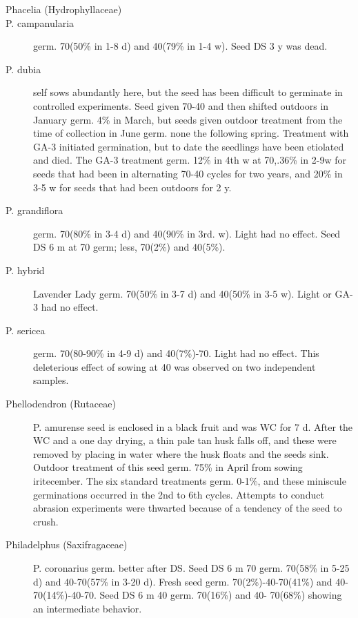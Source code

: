 \begin{description}
\item[Phacelia (Hydrophyllaceae)]
\item[P. campanularia] germ. 70(50\% in 1-8 d) and 40(79\% in 1-4 w). Seed DS 3 y
was dead.
\item[P. dubia] self sows abundantly here, but the seed has been difficult to germinate
in controlled experiments. Seed given 70-40 and then shifted outdoors in January
germ. 4\% in March, but seeds given outdoor treatment from the time of collection in
June germ. none the following spring. Treatment with GA-3 initiated germination, but
to date the seedlings have been etiolated and died. The GA-3 treatment germ. 12\% in
4th w at 70,.36\% in 2-9w for seeds that had been in alternating 70-40 cycles for two
years, and 20\% in 3-5 w for seeds that had been outdoors for 2 y.
\item[P. grandiflora] germ. 70(80\% in 3-4 d) and 40(90\% in 3rd. w). Light had no
effect. Seed DS 6 m at 70 germ; less, 70(2\%) and 40(5\%).
\item[P. hybrid] Lavender Lady germ. 70(50\% in 3-7 d) and 40(50\% in 3-5 w). Light or
GA-3 had no effect.
\item[P. sericea] germ. 70(80-90\% in 4-9 d) and 40(7\%)-70. Light had no effect. This
deleterious effect of sowing at 40 was observed on two independent samples.

\item[Phellodendron (Rutaceae)] P. amurense seed is enclosed in a black fruit
and was WC for 7 d. After the WC and a one day drying, a thin pale tan husk falls off,
and these were removed by placing in water where the husk floats and the seeds sink.
Outdoor treatment of this seed germ. 75\% in April from sowing iritecember. The six
standard treatments germ. 0-1\%, and these miniscule germinations occurred in the
2nd to 6th cycles. Attempts to conduct abrasion experiments were thwarted because
of a tendency of the seed to crush.

\item[Philadelphus (Saxifragaceae)] P. coronarius germ. better after DS. Seed
DS 6 m 70 germ. 70(58\% in 5-25 d) and 40-70(57\% in 3-20 d). Fresh seed germ.
70(2\%)-40-70(41\%) and 40-70(14\%)-40-70. Seed DS 6 m 40 germ. 70(16\%) and 40-
70(68\%) showing an intermediate behavior.


\end{description}
